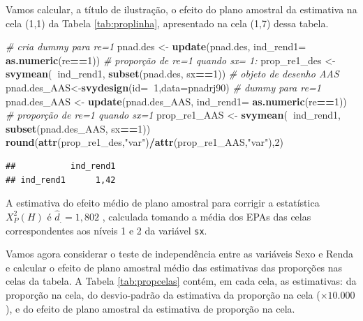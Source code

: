 \documentclass[]{book}
\newenvironment{Shaded}{\begin{snugshade}}{\end{snugshade}}
\newcommand{\KeywordTok}[1]{\textcolor[rgb]{0.13,0.29,0.53}{\textbf{#1}}}
\newcommand{\DataTypeTok}[1]{\textcolor[rgb]{0.13,0.29,0.53}{#1}}
\newcommand{\DecValTok}[1]{\textcolor[rgb]{0.00,0.00,0.81}{#1}}
\newcommand{\StringTok}[1]{\textcolor[rgb]{0.31,0.60,0.02}{#1}}
\newcommand{\CommentTok}[1]{\textcolor[rgb]{0.56,0.35,0.01}{\textit{#1}}}
\newcommand{\OperatorTok}[1]{\textcolor[rgb]{0.81,0.36,0.00}{\textbf{#1}}}
\newcommand{\NormalTok}[1]{#1}
\theoremstyle{definition}
\theoremstyle{definition}
\theoremstyle{definition}
\theoremstyle{remark}
\begin{document}
Vamos calcular, a título de ilustração, o efeito do plano amostral da
estimativa na cela (1,1) da Tabela \ref{tab:proplinha}, apresentado na
cela (1,7) dessa tabela.

\begin{Shaded}
\begin{Highlighting}[]
\CommentTok{# cria dummy para re=1}
\NormalTok{pnad.des <-}\StringTok{ }\KeywordTok{update}\NormalTok{(pnad.des, }
  \DataTypeTok{ind_rend1=} \KeywordTok{as.numeric}\NormalTok{(re}\OperatorTok{==}\DecValTok{1}\NormalTok{))}
\CommentTok{# proporção de re=1 quando  sx= 1:}
\NormalTok{prop_re1_des <-}\StringTok{ }\KeywordTok{svymean}\NormalTok{(}\OperatorTok{~}\NormalTok{ind_rend1, }\KeywordTok{subset}\NormalTok{(pnad.des, sx}\OperatorTok{==}\DecValTok{1}\NormalTok{))}
\CommentTok{# objeto de desenho AAS}
\NormalTok{pnad.des_AAS<-}\KeywordTok{svydesign}\NormalTok{(}\DataTypeTok{id=}\OperatorTok{~}\DecValTok{1}\NormalTok{,}\DataTypeTok{data=}\NormalTok{pnadrj90)}
\CommentTok{# dummy para re=1}
\NormalTok{pnad.des_AAS <-}\StringTok{ }\KeywordTok{update}\NormalTok{(pnad.des_AAS, }
  \DataTypeTok{ind_rend1=} \KeywordTok{as.numeric}\NormalTok{(re}\OperatorTok{==}\DecValTok{1}\NormalTok{))}
\CommentTok{# proporção de re=1 quando sx=1}
\NormalTok{prop_re1_AAS <-}\StringTok{ }\KeywordTok{svymean}\NormalTok{(}\OperatorTok{~}\NormalTok{ind_rend1, }\KeywordTok{subset}\NormalTok{(pnad.des_AAS, sx}\OperatorTok{==}\DecValTok{1}\NormalTok{))}
\KeywordTok{round}\NormalTok{(}\KeywordTok{attr}\NormalTok{(prop_re1_des,}\StringTok{"var"}\NormalTok{)}\OperatorTok{/}\KeywordTok{attr}\NormalTok{(prop_re1_AAS,}\StringTok{"var"}\NormalTok{),}\DecValTok{2}\NormalTok{)}
\end{Highlighting}
\end{Shaded}

\begin{verbatim}
##           ind_rend1
## ind_rend1      1,42
\end{verbatim}

A estimativa do efeito médio de plano amostral para corrigir a
estatística \(X_{P}^{2}\left( H\right)\) é \(\hat{d}_{.}=1,802\) ,
calculada tomando a média dos EPAs das celas correspondentes aos níveis
1 e 2 da variável \texttt{sx}.

Vamos agora considerar o teste de independência entre as variáveis Sexo
e Renda e calcular o efeito de plano amostral médio das estimativas das
proporções nas celas da tabela. A Tabela \ref{tab:propcelas} contém, em
cada cela, as estimativas: da proporção na cela, do desvio-padrão da
estimativa da proporção na cela (\(\times 10.000\)), e do efeito de
plano amostral da estimativa de proporção na cela.
\end{document}
